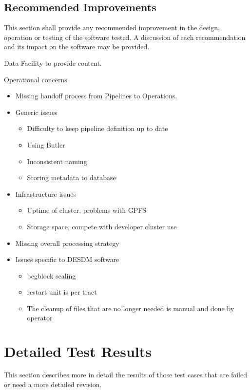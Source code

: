 \documentclass[DM,lsstdraft,STR,toc]{lsstdoc}
\begin{document}
\subsection{Recommended Improvements \label{sect:recommendations}}
This section shall provide any recommended improvement in the design, operation or testing of the software tested. A discussion
of each recommendation and its impact on the software may be provided.

\begin{note}
Data Facility to provide content.
\end{note}

Operational concerns
\begin{itemize}
  \item Missing handoff process from Pipelines to Operations.
  \item Generic issues
  \begin{itemize}
    \item Difficulty to keep pipeline definition up to date
    \item Using Butler
    \item Inconsistent naming
    \item Storing metadata to database
  \end{itemize}
  \item Infrastructure issues
  \begin{itemize}
    \item Uptime of cluster, problems with GPFS
    \item Storage space, compete with developer cluster use
  \end{itemize}
  \item Missing overall processing strategy
  \item Issues specific to DESDM software
  \begin{itemize}
    \item begblock scaling
    \item restart unit is per tract
    \item The cleanup of files that are no longer needed is manual and done by operator
  \end{itemize}
\end{itemize}

\newpage

\section{Detailed Test Results \label{sect:detailed}}
This section describes more in detail the results of those test cases that are failed or need a more detailed revision.
\end{document}
